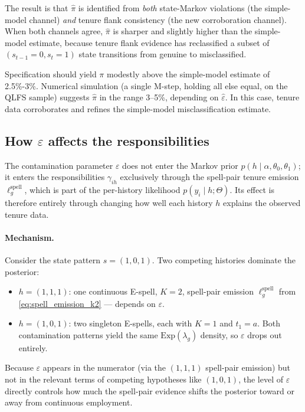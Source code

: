 \documentclass[12pt]{article}
\begin{document}
The result is that \(\hat\pi\) is identified from \emph{both} state-Markov
violations (the simple-model channel) \emph{and} tenure flank consistency
(the new corroboration channel). When both channels agree, \(\hat\pi\) is
sharper and slightly higher than the simple-model estimate, because tenure
flank evidence has reclassified a subset of \((s_{t-1}=0, s_t=1)\) state
transitions from genuine to misclassified.

Specification should yield \(\pi\) modestly
above the simple-model estimate of 2.5\%-3\%. Numerical simulation (a single
M-step, holding all else equal, on the QLFS sample) suggests \(\hat\pi\)
in the range 3--5\%, depending on \(\hat\varepsilon\). 
In this case, tenure data corroborates and refines the simple-model misclassification
estimate.

\subsection{How \(\varepsilon\) affects the responsibilities}
\label{sec:eps_affects_gamma}

The contamination parameter \(\varepsilon\) does not enter the Markov
prior \(p(h \mid \alpha,\theta_0,\theta_1)\); it enters the
responsibilities \(\gamma_{ih}\) exclusively through the spell-pair
tenure emission \(\ell_g^{\mathrm{spell}}\), which is part of the
per-history likelihood \(p(y_i \mid h; \Theta)\). Its effect is
therefore entirely through changing how well each history \(h\) explains
the observed tenure data.

\paragraph{Mechanism.}
Consider the state pattern \(s = (1,0,1)\). Two competing histories
dominate the posterior:
\begin{itemize}
\item \(h = (1,1,1)\): one continuous E-spell, \(K = 2\), spell-pair
  emission \(\ell_g^{\mathrm{spell}}\) from \eqref{eq:spell_emission_k2}
  --- depends on \(\varepsilon\).
\item \(h = (1,0,1)\): two singleton E-spells, each with \(K = 1\) and
  \(t_1 = a\). Both contamination patterns yield the same
  \(\mathrm{Exp}(\lambda_g)\) density, so \(\varepsilon\) drops out
  entirely.
\end{itemize}
Because \(\varepsilon\) appears in the numerator (via the \((1,1,1)\)
spell-pair emission) but not in the relevant terms of competing
hypotheses like \((1,0,1)\), the level of \(\varepsilon\) directly
controls how much the spell-pair evidence shifts the posterior toward or
away from continuous employment.
\end{document}
